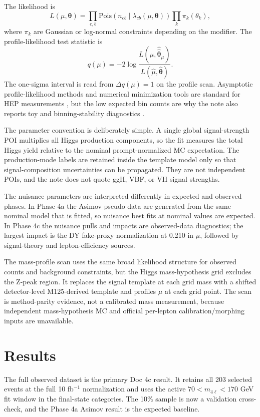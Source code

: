 \documentclass[11pt]{article}
\begin{document}
The likelihood is
\begin{equation}
 L(\mu,\boldsymbol{\theta}) =
 \prod_{c,b}\mathrm{Pois}\!\left(n_{cb}\mid \lambda_{cb}(\mu,\boldsymbol{\theta})\right)
 \prod_k \pi_k(\theta_k),
 \label{eq:likelihood}
\end{equation}
where $\pi_k$ are Gaussian or log-normal constraints depending on the modifier. The profile-likelihood test statistic is
\begin{equation}
 q(\mu) = -2\log\frac{L(\mu,\hat{\hat{\boldsymbol{\theta}}}_{\mu})}{L(\hat{\mu},\hat{\boldsymbol{\theta}})}.
 \label{eq:profile}
\end{equation}
The one-sigma interval is read from $\Delta q(\mu)=1$ on the profile scan. Asymptotic profile-likelihood methods and numerical minimization tools are standard for HEP measurements \cite{Cowan2011,Minuit}, but the low expected bin counts are why the note also reports toy and binning-stability diagnostics \cite{Cowan2011}.

The parameter convention is deliberately simple. A single global signal-strength POI multiplies all Higgs production components, so the fit measures the total Higgs yield relative to the nominal prompt-normalized MC expectation. The production-mode labels are retained inside the template model only so that signal-composition uncertainties can be propagated. They are not independent POIs, and the note does not quote ggH, VBF, or VH signal strengths.

The nuisance parameters are interpreted differently in expected and observed phases. In Phase 4a the Asimov pseudo-data are generated from the same nominal model that is fitted, so nuisance best fits at nominal values are expected. In Phase 4c the nuisance pulls and impacts are observed-data diagnostics; the largest impact is the DY fake-proxy normalization at 0.210 in $\mu$, followed by signal-theory and lepton-efficiency sources.

The mass-profile scan uses the same broad likelihood structure for observed counts and background constraints, but the Higgs mass-hypothesis grid excludes the Z-peak region. It replaces the signal template at each grid mass with a shifted detector-level M125-derived template and profiles $\mu$ at each grid point. The scan is method-parity evidence, not a calibrated mass measurement, because independent mass-hypothesis MC and official per-lepton calibration/morphing inputs are unavailable.

\section{Results}
The full observed dataset is the primary Doc 4c result. It retains all 203 selected events at the full 10 fb$^{-1}$ normalization and uses the active $70 < m_{4\ell} < 170$ GeV fit window in the final-state categories. The 10\% sample is now a validation cross-check, and the Phase 4a Asimov result is the expected baseline.
\end{document}
